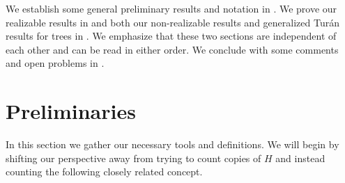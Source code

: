 \documentclass[12pt,letterpaper]{article}
\theoremstyle{definition}
\newcommand{\re}{r} %
\begin{document}
	
	We establish some general preliminary results and notation in .  We prove our realizable results in  and both our non-realizable results and generalized Tur\'an results for trees in .  We emphasize that these two sections are independent of each other and can be read in either order.  We conclude with some comments and open problems in .
	
	
	
	
	\section{Preliminaries}\label{section preliminaries}
	In this section we gather our necessary tools and definitions.  We will begin by shifting our perspective away from trying to count copies of $H$ and instead counting the following closely related concept.
	
\end{document}
